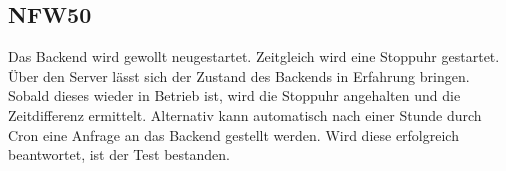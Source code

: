 \subsection*{NFW50}

Das Backend wird gewollt neugestartet. Zeitgleich wird eine Stoppuhr gestartet.
Über den Server lässt sich der Zustand des Backends in Erfahrung bringen.
Sobald dieses wieder in Betrieb ist, wird die Stoppuhr angehalten und die Zeitdifferenz ermittelt.
Alternativ kann automatisch nach einer Stunde durch Cron eine Anfrage an das Backend gestellt werden.
Wird diese erfolgreich beantwortet, ist der Test bestanden.